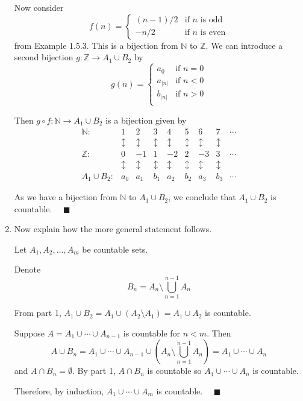 \documentclass[11pt]{article}
\numberwithin{equation}{section}
\theoremstyle{definition}
\theoremstyle{remark}
\newcommand{\Z}{\mathbb{Z}}
\newcommand{\N}{\mathbb{N}}
\renewcommand{\qed}{\quad \blacksquare}
\newcommand{\abs}[1]{\left\vert #1 \right\vert}
\begin{document}
\begin{enumerate}[label=(\alph*)]
            Now consider 
            \[f(n) = \begin{cases}
                (n-1)/2 & \text{if } n \text{ is odd}\\
                -n/2 & \text{if } n \text{ is even}
            \end{cases}\]
            from Example 1.5.3. This is a bijection from $\N$ to $\Z$. We can introduce a second bijection $g: \Z \to A_1 \cup B_2$ by 
            \[g(n) = \begin{cases}
                a_0 & \text{if } n = 0\\
                a_{\abs{n}} & \text{if } n < 0\\ 
                b_{\abs{n}} & \text{if } n > 0\\
            \end{cases}\]
            
            Then $g \circ f: \N \to A_1 \cup B_2$ is a bijection given by 
            \[\begin{array}{ccccccccc}
                \N: & 1 & 2 & 3 & 4 & 5 & 6 & 7 & \cdots\\
                    & \updownarrow & \updownarrow & \updownarrow & \updownarrow & \updownarrow & \updownarrow & \updownarrow\\
                \Z: & 0 & -1 & 1 & -2 & 2 & -3 & 3 & \cdots\\ 
                    & \updownarrow & \updownarrow & \updownarrow & \updownarrow & \updownarrow & \updownarrow & \updownarrow\\
                A_1\cup B_2: & a_0 & a_1 & b_1 & a_2 & b_2 & a_3 & b_3 & \cdots
            \end{array}\]
            
            As we have a bijection from $\N$ to $A_1 \cup B_2$, we conclude that $A_1 \cup B_2$ is countable. $\qed$
        \color{black}

    \item Now explain how the more general statement follows.
    
        \color{blue}
            Let $A_1, A_2, \dots, A_m$ be countable sets. 

            Denote 
            \[B_n = A_{n} \setminus \bigcup_{n=1}^{n-1} A_n\]
            
            From part 1, $A_1 \cup B_2 = A_1 \cup (A_2 \setminus A_1) = A_1 \cup A_2$ is countable. 

            Suppose $A = A_1 \cup \cdots \cup A_{n-1}$ is countable for $n < m$. Then 
            \[A \cup B_n = A_1 \cup \cdots \cup A_{n-1} \cup \left(A_n \setminus \bigcup_{n=1}^{n-1} A_n\right) = A_1 \cup \cdots \cup A_n\]
            and $A \cap B_n = \emptyset$. By part 1, $A \cap B_n$ is countable so $A_1 \cup \cdots \cup A_n$ is countable.

            Therefore, by induction, $A_1 \cup \cdots \cup A_m$ is countable. $\qed$
        \color{black}

\end{enumerate}
\end{document}
